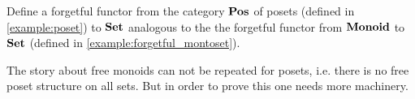 \begin{exer} Define a forgetful functor from the category $\mathbf{Pos}$ of posets (defined in \cref{example:poset}) to $\mathbf{Set}$ analogous to the the forgetful functor from $\mathbf{Monoid}$ to $\mathbf{Set}$ (defined in \cref{example:forgetful_montoset}).
\end{exer}
\begin{rem} The story about free monoids can not be repeated for posets, i.e. there is no free poset structure on all sets. But in order to prove this one needs more machinery.
\end{rem}


